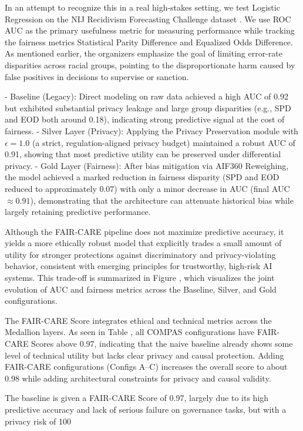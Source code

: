 In an attempt to recognize this in a real high-stakes setting, we test Logistic Regression on the NIJ Recidivism Forecasting Challenge dataset . We use ROC AUC as the primary usefulness metric for measuring performance while tracking the fairness metrics Statistical Parity Difference and Equalized Odds Difference. As mentioned earlier, the organizers emphasize the goal of limiting error-rate disparities across racial groups, pointing to the disproportionate harm caused by false positives in decisions to supervise or sanction.

- Baseline (Legacy): Direct modeling on raw data achieved a high AUC of 0.92 but exhibited substantial privacy leakage and large group disparities (e.g., SPD and EOD both around 0.18), indicating strong predictive signal at the cost of fairness.
- Silver Layer (Privacy): Applying the Privacy Preservation module with $\epsilon = 1.0$ (a strict, regulation-aligned privacy budget) maintained a robust AUC of 0.91, showing that most predictive utility can be preserved under differential privacy.
- Gold Layer (Fairness): After bias mitigation via AIF360 Reweighing, the model achieved a marked reduction in fairness disparity (SPD and EOD reduced to approximately 0.07) with only a minor decrease in AUC (final AUC $\approx 0.91$), demonstrating that the architecture can attenuate historical bias while largely retaining predictive performance.

Although the FAIR-CARE pipeline does not maximize predictive accuracy, it yields a more ethically robust model that explicitly trades a small amount of utility for stronger protections against discriminatory and privacy-violating behavior, consistent with emerging principles for trustworthy, high-risk AI systems. This trade-off is summarized in Figure , which visualizes the joint evolution of AUC and fairness metrics across the Baseline, Silver, and Gold configurations.

The FAIR-CARE Score integrates ethical and technical metrics across the Medallion layers. As seen in Table , all COMPAS configurations have FAIR-CARE Scores above 0.97, indicating that the naive baseline already shows some level of technical utility but lacks clear privacy and causal protection. Adding FAIR-CARE configurations (Configs A--C) increases the overall score to about 0.98 while adding architectural constraints for privacy and causal validity.

The baseline is given a FAIR-CARE Score of 0.97, largely due to its high predictive accuracy and lack of serious failure on governance tasks, but with a privacy risk of 100%

